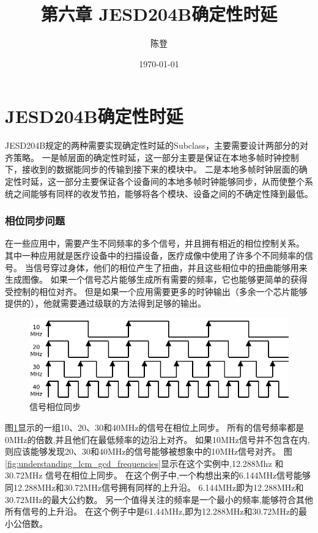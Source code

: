 \documentclass[UTF8]{ctexart}
\title{第六章 JESD204B确定性时延}
\author{陈登}
\date{\today}
\begin{document}
\section{JESD204B确定性时延}

JESD204B规定的两种需要实现确定性时延的Subclass，主要需要设计两部分的对齐策略。
一是帧层面的确定性时延，这一部分主要是保证在本地多帧时钟控制下，接收到的数据能同步的传输到接下来的模块中。
二是本地多帧时钟层面的确定性时延，这一部分主要保证各个设备间的本地多帧时钟能够同步，从而使整个系统之间能够有同样的收发节拍，能够将各个模块、设备之间的不确定性降到最低。

\subsubsection{相位同步问题}

在一些应用中，需要产生不同频率的多个信号，并且拥有相近的相位控制关系。
其中一种应用就是医疗设备中的扫描设备，医疗成像中使用了许多个不同频率的信号。
当信号穿过身体，他们的相位产生了扭曲，并且这些相位中的扭曲能够用来生成图像。
如果一个信号芯片能够生成所有需要的频率，它也能够更简单的获得受控制的相位对齐。
但是如果一个应用需要更多的时钟输出（多余一个芯片能够提供的），他就需要通过级联的方法得到足够的输出。

\begin{figure}[H]
\centering
\includegraphics[width=18cm]{./img/signal_phase_sync.pdf}
\caption{信号相位同步}
\label{fig:signal_phase_sync}
\end{figure}

图\ref{fig:signal_phase_sync}显示的一组10、20、30和40MHz的信号在相位上同步。
所有的信号频率都是 0MHz的倍数,并且他们在最低频率的边沿上对齐。
如果10MHz信号并不包含在内,则应该能够发现20、30和40MHz的信号能够被想象中的10MHz信号对齐。
图\ref{fig:understanding_lcm_gcd_frequencies}显示在这个实例中,12.288Mhz 和 30.72MHz 信号在相位上同步。
在这个例子中,一个构想出来的6.144MHz信号能够同12.288MHz和30.72MHz信号拥有同样的上升沿。
6.144MHz即为12.288MHz和30.72MHz的最大公约数。
另一个值得关注的频率是一个最小的频率,能够符合其他所有信号的上升沿。
在这个例子中是61.44MHz,即为12.288MHz和30.72MHz的最小公倍数。
\end{document}
